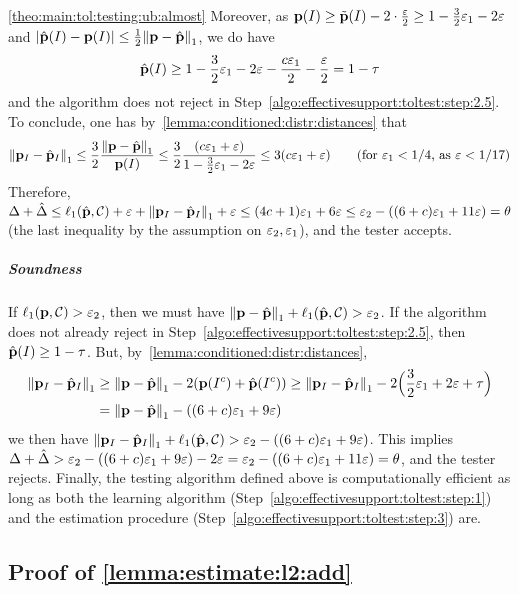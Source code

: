 \begin{proofof}{\cref{theo:main:tol:testing:ub:almost}}
  Moreover, as $\D(I) \geq \tilde{\D}(I) - 2\cdot\frac{\eps}{2} \geq 1-\frac{3}{2}\eps_1-2\eps$ and $\abs{\hat{\D}(I) - \D(I)} \leq \frac{1}{2}\normone{\D-\hat{\D}}$, we do have
  \[
    \hat{\D}(I) \geq 1-\frac{3}{2}\eps_1-2\eps - \frac{c\eps_1}{2}-\frac{\eps}{2} = 1-\tau
  \]
  and the algorithm does not reject in Step~\ref{algo:effectivesupport:toltest:step:2.5}. 
  To conclude, one has by~\cref{lemma:conditioned:distr:distances} that
  \[
      \normone{\D_I-\hat{\D}_I} \leq \frac{3}{2}\frac{\normone{\D-\hat{\D}}}{\D(I)} \leq \frac{3}{2}\frac{(c\eps_1+\eps)}{1-\frac{3}{2}\eps_1-2\eps} \leq 3(c\eps_1+\eps) \tag{for $\eps_1 < 1/4$, as $\eps < 1/17$}
  \]
  Therefore, $\Delta+\hat{\Delta} \leq \lp[1](\hat{\D},\class)+\eps + \normone{\D_I-\hat{\D}_I}+\eps \leq (4c+1)\eps_1+6\eps \leq \eps_2 - ((6+c)\eps_1+11\eps) = \theta$ (the last inequality by the assumption on $\eps_2,\eps_1$), and the tester accepts.
\subparagraph{Soundness} If $\lp[1](\D,\class) > \eps_2$, then we must have $\normone{\D-\hat{\D}} + \lp[1](\hat{\D},\class) > \eps_2$. If the algorithm does not already reject in Step~\ref{algo:effectivesupport:toltest:step:2.5}, then $\hat{\D}(I) \geq 1-\tau$. But, by~\cref{lemma:conditioned:distr:distances},
  \begin{align*}
      \normone{\D_I-\hat{\D}_I} &\geq \normone{ \D - \hat{\D} } - 2(\D(I^c) + \hat{\D}(I^c)) \geq \normone{\D_I-\hat{\D}_I} - 2\Big(\frac{3}{2}\eps_1 + 2\eps+\tau\Big) \\
      &= \normone{ \D - \hat{\D} } - ((6+c)\eps_1+9\eps) 
  \end{align*}
  we then have $\normone{\D_I-\hat{\D}_I} + \lp[1](\hat{\D},\class) > \eps_2  - ((6+c)\eps_1+9\eps)$. 
  This implies $\Delta+\hat{\Delta} > \eps_2 - ((6+c)\eps_1+9\eps) -2\eps = \eps_2 - ((6+c)\eps_1+11\eps)  = \theta$, and the tester rejects.
Finally, the testing algorithm defined above is computationally efficient as long as both the learning algorithm (Step~\ref{algo:effectivesupport:toltest:step:1}) and the estimation procedure (Step~\ref{algo:effectivesupport:toltest:step:3}) are.

\end{proofof}
 
  
\subsection{Proof of \cref{lemma:estimate:l2:add}}\label{app:l2:proof}

